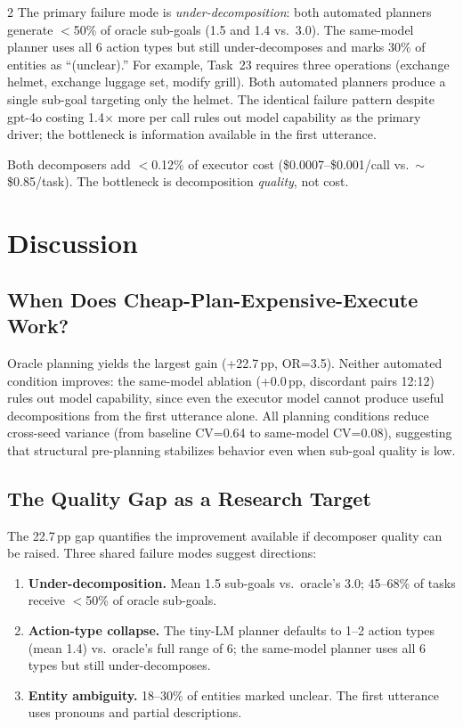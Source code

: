 \documentclass[11pt,a4paper]{article}
\begin{document}
\begin{multicols}{2}
The primary failure mode is \emph{under-decomposition}: both automated planners generate $<$50\% of oracle sub-goals (1.5 and 1.4 vs.\ 3.0). The same-model planner uses all 6 action types but still under-decomposes and marks 30\% of entities as ``(unclear).'' For example, Task~23 requires three operations (exchange helmet, exchange luggage set, modify grill). Both automated planners produce a single sub-goal targeting only the helmet. The identical failure pattern despite gpt-4o costing 1.4$\times$ more per call rules out model capability as the primary driver; the bottleneck is information available in the first utterance.

Both decomposers add $<$0.12\% of executor cost (\$0.0007--\$0.001/call vs.\ ${\sim}$\$0.85/task). The bottleneck is decomposition \emph{quality}, not cost.


\section{Discussion}

\subsection{When Does Cheap-Plan-Expensive-Execute Work?}

Oracle planning yields the largest gain (+22.7\,pp, OR=3.5). Neither automated condition improves: the same-model ablation (+0.0\,pp, discordant pairs 12:12) rules out model capability, since even the executor model cannot produce useful decompositions from the first utterance alone. All planning conditions reduce cross-seed variance (from baseline CV=0.64 to same-model CV=0.08), suggesting that structural pre-planning stabilizes behavior even when sub-goal quality is low.

\subsection{The Quality Gap as a Research Target}

The 22.7\,pp gap quantifies the improvement available if decomposer quality can be raised. Three shared failure modes suggest directions:

\begin{enumerate}
\item \textbf{Under-decomposition.} Mean 1.5 sub-goals vs.\ oracle's 3.0; 45--68\% of tasks receive $<$50\% of oracle sub-goals.
\item \textbf{Action-type collapse.} The tiny-LM planner defaults to 1--2 action types (mean 1.4) vs.\ oracle's full range of 6; the same-model planner uses all 6 types but still under-decomposes.
\item \textbf{Entity ambiguity.} 18--30\% of entities marked unclear. The first utterance uses pronouns and partial descriptions.
\end{enumerate}


\end{multicols}
\end{document}
